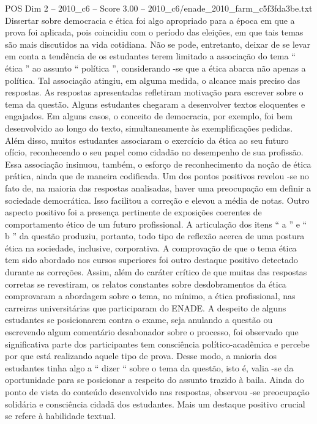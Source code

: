 \begin{textsample}{POS Dim 2 – 2010\_c6 – Score 3.00 – 2010\_c6/enade\_2010\_farm\_c5f3fda3be.txt}
Dissertar sobre democracia e ética foi algo apropriado para a época em que a prova foi aplicada, pois coincidiu com o período das eleições, em que tais temas são mais discutidos na vida cotidiana.
Não se pode, entretanto, deixar de se levar em conta a tendência de os estudantes terem limitado a associação do tema “ ética ” ao assunto “ política ”, considerando -se que a ética abarca não apenas a política.
Tal associação atingiu, em alguma medida, o alcance mais preciso das respostas.
As respostas apresentadas refletiram motivação para escrever sobre o tema da questão.
Alguns estudantes chegaram a desenvolver textos eloquentes e engajados.
Em alguns casos, o conceito de democracia, por exemplo, foi bem desenvolvido ao longo do texto, simultaneamente às exemplificações pedidas.
Além disso, muitos estudantes associaram o exercício da ética ao seu futuro ofício, reconhecendo o seu papel como cidadão no desempenho de sua profissão.
Essa associação insinuou, também, o esforço de reconhecimento da noção de ética prática, ainda que de maneira codificada.
Um dos pontos positivos revelou -se no fato de, na maioria das respostas analisadas, haver uma preocupação em definir a sociedade democrática.
Isso facilitou a correção e elevou a média de notas.
Outro aspecto positivo foi a presença pertinente de exposições coerentes de comportamento ético de um futuro profissional.
A articulação dos itens “ a ” e “ b ” da questão produziu, portanto, todo tipo de reflexão acerca de uma postura ética na sociedade, inclusive, corporativa.
A comprovação de que o tema ética tem sido abordado nos cursos superiores foi outro destaque positivo detectado durante as correções.
Assim, além do caráter crítico de que muitas das respostas corretas se revestiram, os relatos constantes sobre desdobramentos da ética comprovaram a abordagem sobre o tema, no mínimo, a ética profissional, nas carreiras universitárias que participaram do ENADE.
A despeito de alguns estudantes se posicionarem contra o exame, seja anulando a questão ou escrevendo algum comentário desabonador sobre o processo, foi observado que significativa parte dos participantes tem consciência político-acadêmica e percebe por que está realizando aquele tipo de prova.
Desse modo, a maioria dos estudantes tinha algo a “ dizer “ sobre o tema da questão, isto é, valia -se da oportunidade para se posicionar a respeito do assunto trazido à baila.
Ainda do ponto de vista do conteúdo desenvolvido nas respostas, observou -se preocupação solidária e consciência cidadã dos estudantes.
Mais um destaque positivo crucial se refere à habilidade textual.

\end{textsample}
